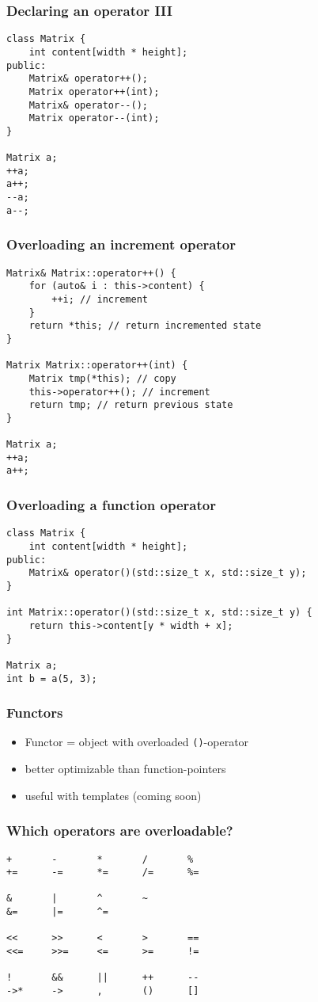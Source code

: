 \begin{frame}[fragile]
    \frametitle{Declaring an operator III}
    \begin{lstlisting}[numbers=none]
class Matrix {
    int content[width * height];
public:
    Matrix& operator++();
    Matrix operator++(int);
    Matrix& operator--();
    Matrix operator--(int);
}

Matrix a;
++a;
a++;
--a;
a--;
    \end{lstlisting}
\end{frame}

\begin{frame}[fragile]
    \frametitle{Overloading an increment operator}
    \begin{lstlisting}[numbers=none]
Matrix& Matrix::operator++() {
    for (auto& i : this->content) {
        ++i; // increment
    }
    return *this; // return incremented state
}

Matrix Matrix::operator++(int) {
    Matrix tmp(*this); // copy
    this->operator++(); // increment
    return tmp; // return previous state
}

Matrix a;
++a;
a++;
    \end{lstlisting}
\end{frame}

\begin{frame}[fragile]
    \frametitle{Overloading a function operator}
    \begin{lstlisting}[numbers=none]
class Matrix {
    int content[width * height];
public:
    Matrix& operator()(std::size_t x, std::size_t y);
}

int Matrix::operator()(std::size_t x, std::size_t y) {
    return this->content[y * width + x];
}

Matrix a;
int b = a(5, 3);
    \end{lstlisting}
\end{frame}

\begin{frame}[fragile]
    \frametitle{Functors}
    \begin{itemize}
    \item Functor = object with overloaded \lstinline{()}-operator
    \item better optimizable than function-pointers
    \item useful with templates (coming soon)
    \end{itemize}
\end{frame}

\begin{frame}[fragile]
    \frametitle{Which operators are overloadable?}
    \begin{lstlisting}[numbers=none]
+       -       *       /       %
+=      -=      *=      /=      %=

&       |       ^       ~
&=      |=      ^=      

<<      >>      <       >       ==
<<=     >>=     <=      >=      !=

!       &&      ||      ++      --
->*     ->      ,       ()      []
    \end{lstlisting}
\end{frame}

